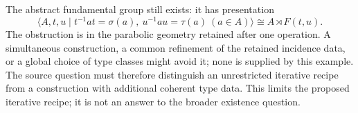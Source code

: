 The abstract fundamental group still exists: it has presentation
\[
 \langle A,t,u\mid t^{-1}at=\sigma(a),\ u^{-1}au=\tau(a)
 \ (a\in A)\rangle
 \cong A\rtimes F(t,u).
\]
The obstruction is in the parabolic geometry retained after one operation.
A simultaneous construction, a common refinement of the retained incidence
data, or a global choice of type classes might avoid it; none is supplied
by this example. The source question must therefore distinguish an
unrestricted iterative recipe from a construction with additional coherent
type data. This limits the proposed iterative recipe; it is not an answer to the broader existence question.
